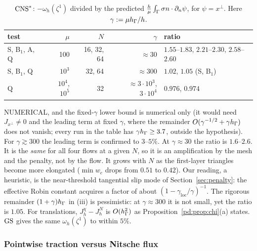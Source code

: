 \begin{table}[h]\centering\footnotesize
\caption{$\mathrm{CNS}^\ast$: $-\omega_h(\zeta^1)$ divided by the predicted $\frac h\mu\int_\Gamma\sigma n\cdot\partial_n\psi$, for $\psi=x^\perp$. Here $\gamma:=\mu h_\Gamma/h$.}\label{pd:tab:e}
\begin{tabular}{lrrrl}
\toprule
test & $\mu$ & $N$ & $\gamma$ & ratio\\
\midrule
S, B$_1$, A, Q & 100 & 16, 32, 64 & $\approx30$ & $1.55$--$1.83$, $2.21$--$2.30$, $2.58$--$2.60$\\
S, B$_1$, Q & $10^3$ & 32, 64 & $\approx300$ & $1.02$, $1.05$ (S, B$_1$)\\
Q & $10^4$, $10^5$ & 32 & $\approx3\cdot10^3$, $3\cdot10^4$ & $0.976$, $0.974$\\
\bottomrule
\end{tabular}
\end{table}
NUMERICAL, and the fixed-$\gamma$ lower bound is numerical only (it would need $J_{x^\perp}\ne0$ and the leading term at fixed $\gamma$, where the remainder $O(\gamma^{-1/2}+\gamma h_\Gamma)$ does not vanish; every run in the table has $\gamma h_\Gamma\ge3.7$, outside the hypothesis). For $\gamma\gtrsim300$ the leading term is confirmed to $3$--$5\%$. At $\gamma\approx30$ the ratio is $1.6$--$2.6$. It is the \emph{same} for all four flows at a given $N$, so it is an amplification by the mesh and the penalty, not by the flow. It grows with $N$ as the first-layer triangles become more elongated ($\min w_e$ drops from $0.51$ to $0.42$). Our reading, a heuristic, is the near-threshold tangential slip mode of Section~\ref{sec:penalty}: the effective Robin constant acquires a factor of about $(1-\gamma_{\mathrm{loc}}/\gamma)^{-1}$. The rigorous remainder $(1+\gamma)h_\Gamma$ in (iii) is pessimistic: at $\gamma\approx300$ it is not small, yet the ratio is $1.05$. For translations, $J^\chi_h-J^N_h$ is $O(h_\Gamma^2)$ as Proposition~\ref{pd:prop:chi}(a) states. $\mathrm{GS}$ gives the same $\omega_h(\zeta^1)$ to within $5\%$. 


\subsubsection{Pointwise traction versus Nitsche flux}

